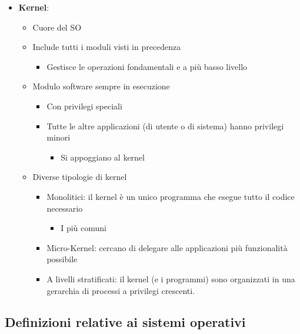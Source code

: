 \documentclass[]{article}
\providecommand{\tightlist}{%
  \setlength{\itemsep}{0pt}\setlength{\parskip}{0pt}}
\begin{document}
\begin{itemize}
\tightlist
\item
  \textbf{Kernel}:

  \begin{itemize}
  \tightlist
  \item
    Cuore del SO
  \item
    Include tutti i moduli visti in precedenza

    \begin{itemize}
    \tightlist
    \item
      Gestisce le operazioni fondamentali e a più basso livello
    \end{itemize}
  \item
    Modulo software sempre in esecuzione

    \begin{itemize}
    \tightlist
    \item
      Con privilegi speciali
    \item
      Tutte le altre applicazioni (di utente o di sistema) hanno
      privilegi minori

      \begin{itemize}
      \tightlist
      \item
        Si appoggiano al kernel
      \end{itemize}
    \end{itemize}
  \item
    Diverse tipologie di kernel

    \begin{itemize}
    \tightlist
    \item
      Monolitici: il kernel è un unico programma che esegue tutto il
      codice necessario

      \begin{itemize}
      \tightlist
      \item
        I più comuni
      \end{itemize}
    \item
      Micro-Kernel: cercano di delegare alle applicazioni più
      funzionalità possibile
    \item
      A livelli stratificati: il kernel (e i programmi) sono organizzati
      in una gerarchia di processi a privilegi crescenti.
    \end{itemize}
  \end{itemize}
\end{itemize}

\hypertarget{definizioni-relative-ai-sistemi-operativi-1}{%
\subsection{Definizioni relative ai sistemi
operativi}\label{definizioni-relative-ai-sistemi-operativi-1}}
\end{document}
